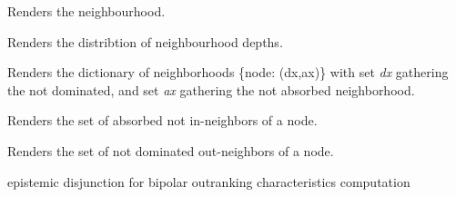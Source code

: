 \documentclass[letterpaper,10pt,english]{sphinxmanual}
\begin{document}
\begin{fulllineitems}
\begin{fulllineitems}
\label{techDoc:digraphs.Digraph.neighbourhoodCollection}
Renders the neighbourhood.

\end{fulllineitems}


\begin{fulllineitems}
\label{techDoc:digraphs.Digraph.neighbourhoodDepthDistribution}
Renders the distribtion of neighbourhood depths.

\end{fulllineitems}


\begin{fulllineitems}
\label{techDoc:digraphs.Digraph.notGammaSets}
Renders the dictionary of neighborhoods \{node: (dx,ax)\}
with set \emph{dx} gathering the not dominated, and set \emph{ax} gathering
the not absorbed neighborhood.

\end{fulllineitems}


\begin{fulllineitems}
\label{techDoc:digraphs.Digraph.notaneighbors}
Renders the set of absorbed not in-neighbors of a node.

\end{fulllineitems}


\begin{fulllineitems}
\label{techDoc:digraphs.Digraph.notdneighbors}
Renders the set of not dominated out-neighbors of a node.

\end{fulllineitems}


\begin{fulllineitems}
\label{techDoc:digraphs.Digraph.omax}
epistemic disjunction for bipolar outranking characteristics
computation


\end{fulllineitems}
\end{fulllineitems}
\end{document}
